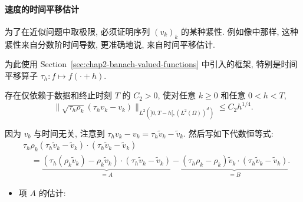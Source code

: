 \begin{sloppypar}
\paragraph{速度的时间平移估计}
\label{subsec:chap6-velocity-time-translations}

为了在近似问题中取极限, 必须证明序列 $(v_k)_k$ 的某种紧性. 例如像中那样, 这种紧性来自分数阶时间导数, 更准确地说, 来自时间平移估计.

为此使用 Section~\ref{sec:chap2-banach-valued-functions} 中引入的框架, 特别是时间平移算子 $\tau_h:f\mapsto f(\cdot+h)$.

\begin{Lemma}
\label{lem:chap6-weighted-velocity-time-translation}
存在仅依赖于数据和终止时刻 $T$ 的 $C_2>0$, 使对任意 $k\geq0$ 和任意 $0<h<T$,
\begin{equation}
 \|\sqrt{\tau_h\rho_k}(\tau_hv_k-v_k)\|_{L^2(]0,T-h[,(L^2(\Omega))^d)}
 \leq C_2h^{1/4}.
\label{eq:chap6-weighted-velocity-time-translation}
\end{equation}
\end{Lemma}

\begin{Proof}
因为 $v_b$ 与时间无关, 注意到 $\tau_hv_k-v_k=\tau_h\widetilde v_k-\widetilde v_k$. 然后写如下代数恒等式:
\begin{equation}
\begin{aligned}
 &\tau_h\rho_k(\tau_h\widetilde v_k-\widetilde v_k)
 \cdot(\tau_h\widetilde v_k-\widetilde v_k)\\
 &\quad=\underbrace{(\tau_h(\rho_k\widetilde v_k)-\rho_k\widetilde v_k)
 \cdot(\tau_h\widetilde v_k-\widetilde v_k)}_{=A}
 -\underbrace{(\tau_h\rho_k-\rho_k)\widetilde v_k
 \cdot(\tau_h\widetilde v_k-\widetilde v_k)}_{=B}.
\end{aligned}
\label{eq:chap6-time-translation-algebraic-identity}
\end{equation}

\begin{itemize}
 \item 项 $A$ 的估计:


\end{itemize}
\end{Proof}
\end{sloppypar}
